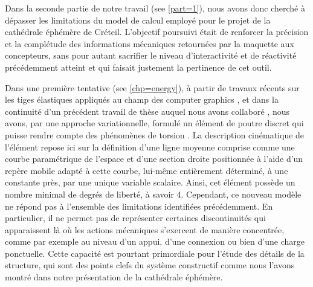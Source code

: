 Dans la seconde partie de notre travail (see \cref{part=1}), nous avons donc cherché à dépasser les limitations du model de calcul employé pour le projet de la cathédrale éphémère de Créteil. L'objectif poursuivi était de renforcer la précision et la complétude des informations mécaniques retournées par la maquette aux concepteurs, sans pour autant sacrifier le niveau d'interactivité et de réactivité précédemment atteint et qui faisait justement la pertinence de cet outil.

Dans une première tentative (see \cref{chp=energy}), à partir de travaux récents sur les tiges élastiques appliqués au champ des computer graphics \cite{Bergou2008}, et dans la continuité d'un précédent travail de thèse auquel nous avons collaboré \cite{Tayeb2015a}, nous avons, par une approche variationnelle, formulé un élément de poutre discret qui puisse rendre compte des phénomènes de torsion \cite{Lefevre2017}. La description cinématique de l'élément repose ici sur la définition d'une ligne moyenne comprise comme une courbe paramétrique de l'espace et d'une section droite positionnée à l'aide d'un repère mobile adapté à cette courbe, lui-même entièrement déterminé, à une constante près, par une unique variable scalaire. Ainsi, cet élément possède un nombre minimal de degrés de liberté, à savoir 4. Cependant, ce nouveau modèle ne répond pas à l'ensemble des limitations identifiées précédemment. En particulier, il ne permet pas de représenter certaines discontinuités qui apparaissent là où les actions mécaniques s'exercent de manière concentrée, comme par exemple au niveau d'un appui, d'une connexion ou bien d'une charge ponctuelle. Cette capacité est pourtant primordiale pour l'étude des détails de la structure, qui sont des points clefs du système constructif comme nous l'avons montré dans notre présentation de la cathédrale éphémère.

